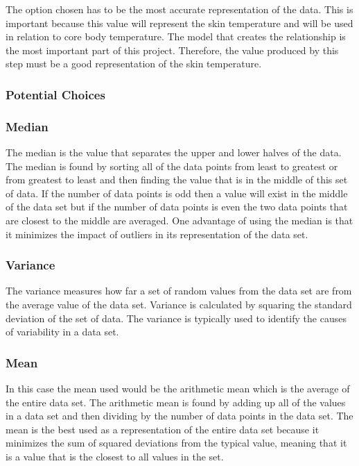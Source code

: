 		The option chosen has to be the most accurate representation of the data. This is important because this value will represent the skin temperature and will be used in relation to core body temperature. The model that creates the relationship is the most important part of this project. Therefore, the value produced by this step must be a good representation of the skin temperature. 
		\subsubsection*{Potential Choices}

		\subsubsection*{Median}
		
		The median is the value that separates the upper and lower halves of the data. The median is found by sorting all of the data points from least to greatest or from greatest to least and then finding the value that is in the middle of this set of data. If the number of data points is odd then a value will exist in the middle of the data set but if the number of data points is even the two data points that are closest to the middle are averaged. One advantage of using the median is that it minimizes the impact of outliers in its representation of the data set.\cite{Median}

		\subsubsection*{Variance}

        The variance measures how far a set of random values from the data set are from the average value of the data set. Variance is calculated by squaring the standard deviation of the set of data. The variance is typically used to identify the causes of variability in a data set.\cite{Variance}

		\subsubsection*{Mean}
		
		In this case the mean used would be the arithmetic mean which is the average of the entire data set. The arithmetic mean is found by adding up all of the values in a data set and then dividing by the number of data points in the data set. The mean is the best used as a representation of the entire data set because it minimizes the sum of squared deviations from the typical value, meaning that it is a value that is the closest to all values in the set. \cite{Mean}

